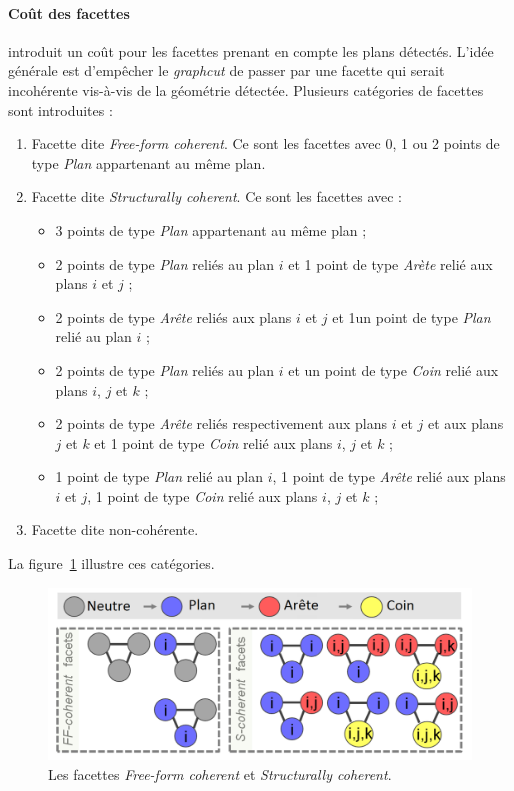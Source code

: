﻿\documentclass[12pt, twoside]{article}
\begin{document}
\paragraph{Coût des facettes} \cite{maillage2} introduit un coût pour les facettes prenant en compte les plans détectés. L'idée générale est d'empêcher le \textit{graphcut} de passer par une facette qui serait incohérente vis-à-vis de la géométrie détectée. Plusieurs catégories de facettes sont introduites :
\begin{enumerate}
  \item Facette dite \textit{Free-form coherent}. Ce sont les facettes avec 0, 1 ou 2 points de type \textit{Plan} appartenant au même plan.
  \item Facette dite \textit{Structurally coherent}. Ce sont les facettes avec :
  \begin{itemize}
    \item 3 points de type \textit{Plan} appartenant au même plan ;
    \item 2 points de type \textit{Plan} reliés au plan $i$ et 1 point de type \textit{Arète} relié aux plans $i$ et $j$ ;
    \item 2 points de type \textit{Arête} reliés aux plans $i$ et $j$ et 1un point de type \textit{Plan} relié au plan $i$ ;
    \item 2 points de type \textit{Plan} reliés au plan $i$ et un point de type \textit{Coin} relié aux plans $i$, $j$ et $k$ ;
    \item 2 points de type \textit{Arête} reliés respectivement aux plans $i$ et $j$ et aux plans $j$ et $k$ et 1 point de type \textit{Coin} relié aux plans $i$, $j$ et $k$ ;
    \item 1 point de type \textit{Plan} relié au plan $i$, 1 point de type \textit{Arête} relié aux plans $i$ et $j$, 1 point de type \textit{Coin} relié aux plans $i$, $j$ et $k$ ;
  \end{itemize}
  \item Facette dite non-cohérente.
\end{enumerate}

La figure~\ref{fig:coherence} illustre ces catégories.

\begin{figure}[h]
\centering
\includegraphics[scale=0.4]{coherent.png}
\caption{\label{fig:coherence} Les facettes \textit{Free-form coherent} et \textit{Structurally coherent}.}
\end{figure}
\end{document}
